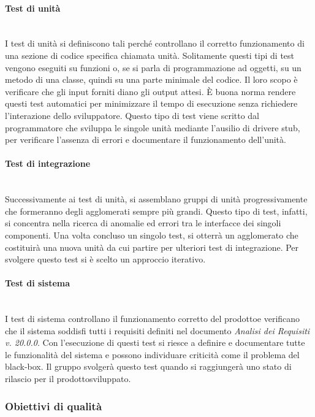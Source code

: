 \paragraph*{Test di unità} \mbox{}\\ [1mm]
I test di unità si definiscono tali perché controllano il corretto funzionamento di una sezione di codice specifica chiamata unità. Solitamente questi tipi di test vengono eseguiti su funzioni o, se si parla di programmazione ad oggetti, su un metodo di una classe, quindi su una parte minimale del codice. Il loro scopo è verificare che gli input forniti diano gli output attesi. È buona norma rendere questi test automatici per minimizzare il tempo di esecuzione senza richiedere l'interazione dello sviluppatore. Questo tipo di test viene scritto dal programmatore che sviluppa le singole unità mediante l'ausilio di driver\glosp e stub\glo, per verificare l'assenza di errori e documentare il funzionamento dell'unità.

\paragraph*{Test di integrazione} \mbox{}\\ [1mm]
Successivamente ai test di unità, si assemblano gruppi di unità progressivamente che formeranno degli agglomerati sempre più grandi. Questo tipo di test, infatti, si concentra nella ricerca di anomalie ed errori tra le interfacce dei singoli componenti. Una volta concluso un singolo test, si otterrà un agglomerato che costituirà una nuova unità da cui partire per ulteriori test di integrazione. Per svolgere questo test si è scelto un approccio iterativo.

\paragraph*{Test di sistema} \mbox{}\\ [1mm]
I test di sistema controllano il funzionamento corretto del prodotto\glosp e verificano che il sistema soddisfi tutti i requisiti definiti nel documento \textit{Analisi dei Requisiti v. 20.0.0}. Con l'esecuzione di questi test si riesce a definire e documentare tutte le funzionalità del sistema e possono individuare criticità come il problema del black-box\glo. Il gruppo svolgerà questo test quando si raggiungerà uno stato di rilascio per il prodotto\glosp sviluppato.

\subsubsection{Obiettivi di qualità}
